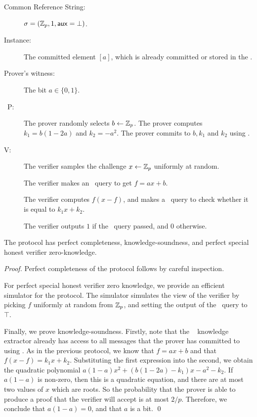 \begin{description} \label{prot:ILCcombits}
\item[Common Reference String:] $\mathsf{\sigma}=(\mathbb{Z}_p,1,\mathsf{aux}=\bot)$.
\item[Instance:] The committed element $[a]$, which is already committed or stored in the \ILC.
%
\item[Prover's witness:] The bit $a \in \lbrace 0,1 \rbrace$.
%
\item[\ P:] The prover randomly selects $b \gets \mathbb{Z}_p$. The prover computes $k_1 = b(1-2a)$ and $k_2 = -a^2$. The prover commits to $b, k_1$ and $k_2$ using \ILCcommit.

\item[V:] The verifier samples the challenge $x \gets \mathbb{Z}_p$ uniformly at random.

The verifier makes an \ILCopen\ query to get $f = ax+b$.

The verifier computes $f(x-f)$, and makes a \ILCcheck\ query to check whether it is equal to $k_1 x + k_2$.

The verifier outputs $1$ if the \ILCcheck\ query passed, and $0$ otherwise.
\end{description}

\begin{lemma} \label{proof:ILCcombits}
The protocol has perfect completeness, knowledge-soundness, and perfect special honest verifier zero-knowledge.
\end{lemma}

\begin{proof}
Perfect completeness of the protocol follows by careful inspection.

For perfect special honest verifier zero knowledge, we provide an efficient simulator for the protocol. The simulator simulates the view of the verifier by picking $f$ uniformly at random from $\mathbb{Z}_p$, and setting the output of the \ILCcheck\ query to $\top$.

Finally, we prove knowledge-soundness. Firstly, note that the \ILC~ knowledge extractor already has access to all messages that the prover has committed to using \ILCcommit. As in the previous protocol, we know that $f = ax+b$ and that $f(x-f) = k_1 x + k_2$. Substituting the first expression into the second, we obtain the quadratic polynomial $a(1-a)x^2 + (b(1-2a)-k_1)x-a^2-k_2$. If $a(1-a)$ is non-zero, then this is a quadratic equation, and there are at most two values of $x$ which are roots. So the probability that the prover is able to produce a proof that the verifier will accept is at most $2/p$. Therefore, we conclude that $a(1-a) = 0$, and that $a$ is a bit. \qed
\end{proof}

